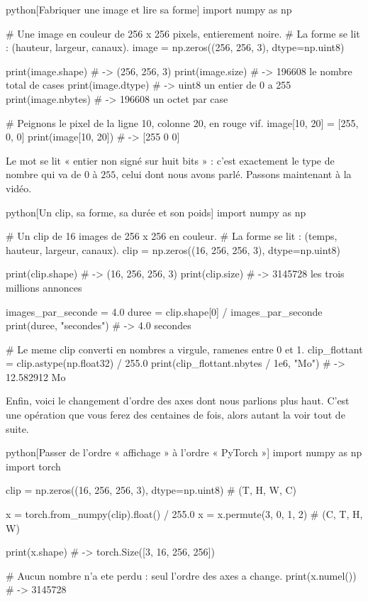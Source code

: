 \begin{code}{python}[Fabriquer une image et lire sa forme]
import numpy as np

# Une image en couleur de 256 x 256 pixels, entierement noire.
# La forme se lit : (hauteur, largeur, canaux).
image = np.zeros((256, 256, 3), dtype=np.uint8)

print(image.shape)   # -> (256, 256, 3)
print(image.size)    # -> 196608   le nombre total de cases
print(image.dtype)   # -> uint8    un entier de 0 a 255
print(image.nbytes)  # -> 196608   un octet par case

# Peignons le pixel de la ligne 10, colonne 20, en rouge vif.
image[10, 20] = [255, 0, 0]
print(image[10, 20])  # -> [255   0   0]
\end{code}

Le mot  se lit « entier non signé sur huit bits » : c'est
exactement le type de nombre qui va de $0$ à $255$, celui dont nous avons
parlé. Passons maintenant à la vidéo.

\begin{code}{python}[Un clip, sa forme, sa durée et son poids]
import numpy as np

# Un clip de 16 images de 256 x 256 en couleur.
# La forme se lit : (temps, hauteur, largeur, canaux).
clip = np.zeros((16, 256, 256, 3), dtype=np.uint8)

print(clip.shape)   # -> (16, 256, 256, 3)
print(clip.size)    # -> 3145728   les trois millions annonces

images_par_seconde = 4.0
duree = clip.shape[0] / images_par_seconde
print(duree, "secondes")            # -> 4.0 secondes

# Le meme clip converti en nombres a virgule, ramenes entre 0 et 1.
clip_flottant = clip.astype(np.float32) / 255.0
print(clip_flottant.nbytes / 1e6, "Mo")   # -> 12.582912 Mo
\end{code}

Enfin, voici le changement d'ordre des axes dont nous parlions plus haut.
C'est une opération que vous ferez des centaines de fois, alors autant la
voir tout de suite.

\begin{code}{python}[Passer de l'ordre « affichage » à l'ordre « PyTorch »]
import numpy as np
import torch

clip = np.zeros((16, 256, 256, 3), dtype=np.uint8)   # (T, H, W, C)

x = torch.from_numpy(clip).float() / 255.0
x = x.permute(3, 0, 1, 2)                            # (C, T, H, W)

print(x.shape)   # -> torch.Size([3, 16, 256, 256])

# Aucun nombre n'a ete perdu : seul l'ordre des axes a change.
print(x.numel())  # -> 3145728
\end{code}


